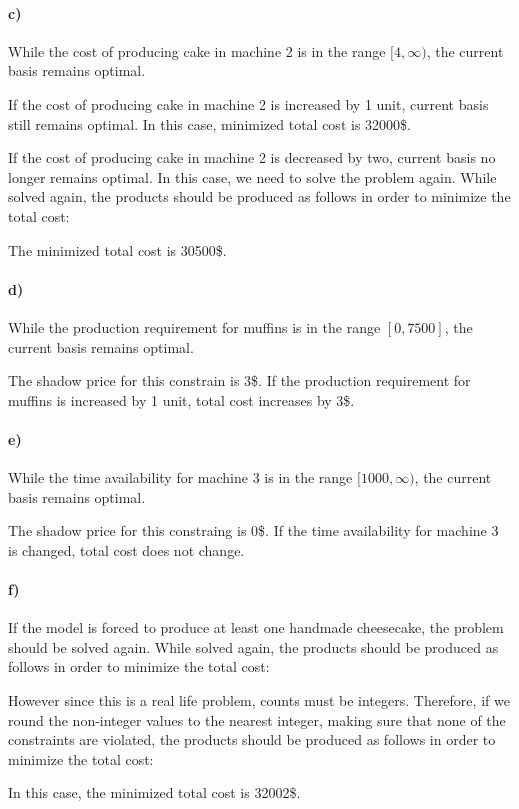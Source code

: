 \documentclass{article}
\begin{document}
\paragraph*{c)}
While the cost of producing cake in machine 2 is in the range $[4, \infty)$, the current basis remains optimal.

If the cost of producing cake in machine 2 is increased by 1 unit, current basis still remains optimal. In this case, minimized total cost is 32000\$.

If the cost of producing cake in machine 2 is decreased by two, current basis no longer remains optimal. In this case, we need to solve the problem again.
While solved again, the products should be produced as follows in order to minimize the total cost:
\begin{figure}[H]
\end{figure}
The minimized total cost is 30500\$.

\paragraph*{d)}
While the production requirement for muffins is in the range $[0, 7500]$, the current basis remains optimal.

The shadow price for this constrain is 3\$.
If the production requirement for muffins is increased by 1 unit, total cost increases by 3\$.

\paragraph*{e)}
While the time availability for machine 3 is in the range $[1000, \infty)$, the current basis remains optimal.

The shadow price for this constraing is 0\$.
If the time availability for machine 3 is changed, total cost does not change.

\paragraph*{f)}
If the model is forced to produce at least one handmade cheesecake, the problem should be solved again.
While solved again, the products should be produced as follows in order to minimize the total cost:
\begin{figure}[H]
\end{figure}
However since this is a real life problem, counts must be integers. Therefore, if we round the non-integer values to the nearest integer, making sure that none of the constraints are violated, the products should be produced as follows in order to minimize the total cost:
\begin{figure}[H]
\end{figure}
In this case, the minimized total cost is 32002\$.
\end{document}
